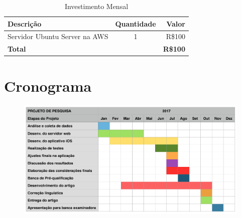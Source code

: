 \documentclass[
	12pt,
	oneside,
	a4paper,
	english,
	brazil,
]{abntex2}
\begin{document}
\noindent
\begin{table}[ht]
    \caption{Investimento Mensal}
    \begin{tabularx}{\textwidth}{X|c|r}
    \hline
        \textbf{Descrição} &
        \textbf{Quantidade} &
        \textbf{Valor} \\
    \hline
        Servidor Ubuntu Server na AWS &1 &R\$100 \\
    \hline
        \textbf{Total}&&\textbf{R\$100} \\ [1ex]
    \end{tabularx}
\end{table}



\chapter{Cronograma}

\begin{figure}[h]
\centering
\includegraphics[width=1.0\textwidth]{cronograma}
\end{figure}


\postextual



%
%
\end{document}
